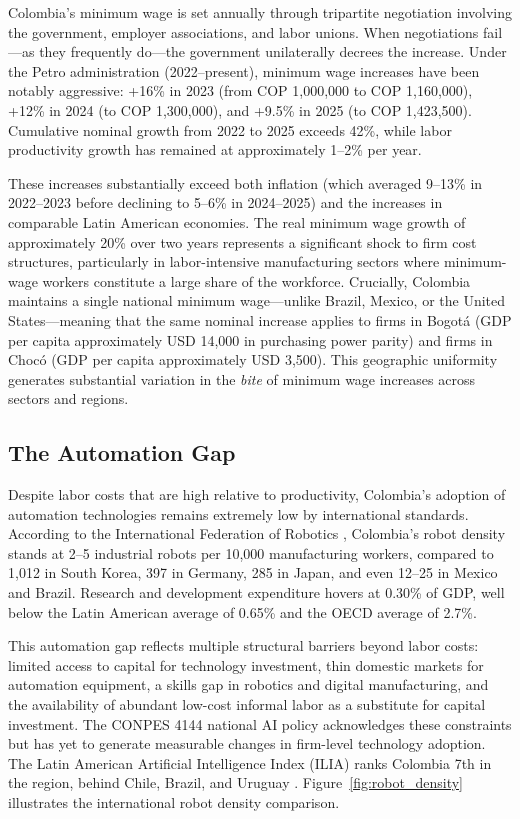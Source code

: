 \documentclass[5p,times,authoryear]{elsarticle}
\begin{document}
Colombia's minimum wage is set annually through tripartite negotiation involving the government, employer associations, and labor unions. When negotiations fail---as they frequently do---the government unilaterally decrees the increase. Under the Petro administration (2022--present), minimum wage increases have been notably aggressive: +16\% in 2023 (from COP 1,000,000 to COP 1,160,000), +12\% in 2024 (to COP 1,300,000), and +9.5\% in 2025 (to COP 1,423,500). Cumulative nominal growth from 2022 to 2025 exceeds 42\%, while labor productivity growth has remained at approximately 1--2\% per year.

These increases substantially exceed both inflation (which averaged 9--13\% in 2022--2023 before declining to 5--6\% in 2024--2025) and the increases in comparable Latin American economies. The real minimum wage growth of approximately 20\% over two years represents a significant shock to firm cost structures, particularly in labor-intensive manufacturing sectors where minimum-wage workers constitute a large share of the workforce. Crucially, Colombia maintains a single national minimum wage---unlike Brazil, Mexico, or the United States---meaning that the same nominal increase applies to firms in Bogot\'{a} (GDP per capita approximately USD 14,000 in purchasing power parity) and firms in Choc\'{o} (GDP per capita approximately USD 3,500). This geographic uniformity generates substantial variation in the \emph{bite} of minimum wage increases across sectors and regions.

\subsection{The Automation Gap}
\label{subsec:automation_gap}

Despite labor costs that are high relative to productivity, Colombia's adoption of automation technologies remains extremely low by international standards. According to the International Federation of Robotics \citep{ifr2024}, Colombia's robot density stands at 2--5 industrial robots per 10,000 manufacturing workers, compared to 1,012 in South Korea, 397 in Germany, 285 in Japan, and even 12--25 in Mexico and Brazil. Research and development expenditure hovers at 0.30\% of GDP, well below the Latin American average of 0.65\% and the OECD average of 2.7\%.

This automation gap reflects multiple structural barriers beyond labor costs: limited access to capital for technology investment, thin domestic markets for automation equipment, a skills gap in robotics and digital manufacturing, and the availability of abundant low-cost informal labor as a substitute for capital investment. The CONPES 4144 national AI policy \citep{conpes4144} acknowledges these constraints but has yet to generate measurable changes in firm-level technology adoption. The Latin American Artificial Intelligence Index (ILIA) ranks Colombia 7th in the region, behind Chile, Brazil, and Uruguay \citep{ilia2024}. Figure~\ref{fig:robot_density} illustrates the international robot density comparison.
\end{document}
